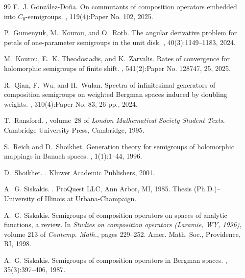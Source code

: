 \documentclass[11pt]{amsart}
\numberwithin{equation}{section}
\theoremstyle{definition}
\begin{document}
\begin{thebibliography}{99}
		F.~J. Gonz{\'a}lez-Do{\~n}a.
		\newblock On commutants of composition operators embedded into {$C_0$}-semigroups.
		, 119(4):Paper No. 102, 2025.
		
		P.~Gumenyuk, M.~Kourou, and O.~Roth.
		\newblock The angular derivative problem for petals of one-parameter semigroups in the unit disk.
		, 40(3):1149--1183, 2024.
		
		M.~Kourou, E.~K. Theodosiadis, and K.~Zarvalis.
		\newblock Rates of convergence for holomorphic semigroups of finite shift.
		, 541(2):Paper No. 128747, 25, 2025.
		
		R.~Qian, F.~Wu, and H.~Wulan.
		\newblock Spectra of infinitesimal generators of composition semigroups on weighted {B}ergman spaces induced by doubling weights.
		, 310(4):Paper No. 83, 26 pp., 2024.
		
		T.~Ransford.
		, volume~28 of {\em London Mathematical Society Student Texts}.
		\newblock Cambridge University Press, Cambridge, 1995.
		
		S.~Reich and D.~Shoikhet.
		\newblock Generation theory for semigroups of holomorphic mappings in {B}anach spaces.
		, 1(1):1--44, 1996.
		
		D.~Shoikhet.
		.
		\newblock Kluwer Academic Publishers, 2001.
		
		A.~G. Siskakis.
		.
		\newblock ProQuest LLC, Ann Arbor, MI, 1985.
		\newblock Thesis (Ph.D.)--University of Illinois at Urbana-Champaign.
		
		A.~G. Siskakis.
		\newblock Semigroups of composition operators on spaces of analytic functions, a review.
		\newblock In {\em Studies on composition operators ({L}aramie, {WY}, 1996)}, volume 213 of {\em Contemp. Math.}, pages 229--252. Amer. Math. Soc., Providence, RI, 1998.
		
		A.~G. Siskakis.
		\newblock Semigroups of composition operators in {B}ergman spaces.
		, 35(3):397--406, 1987.
		

\end{thebibliography}
\end{document}
